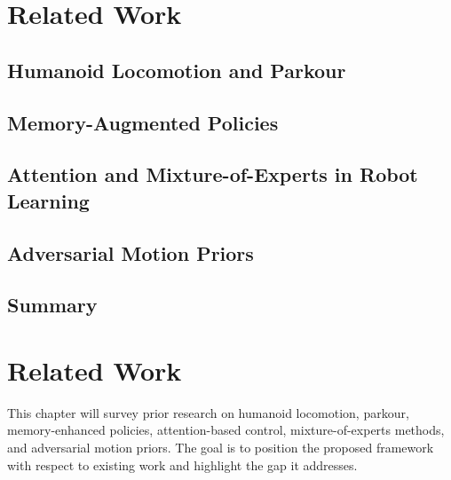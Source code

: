 \chapter{Related Work}

\section{Humanoid Locomotion and Parkour}
\section{Memory-Augmented Policies}
\section{Attention and Mixture-of-Experts in Robot Learning}
\section{Adversarial Motion Priors}
\section{Summary}\chapter{Related Work}

This chapter will survey prior research on humanoid locomotion, parkour, memory-enhanced policies, attention-based control, mixture-of-experts methods, and adversarial motion priors. The goal is to position the proposed framework with respect to existing work and highlight the gap it addresses.